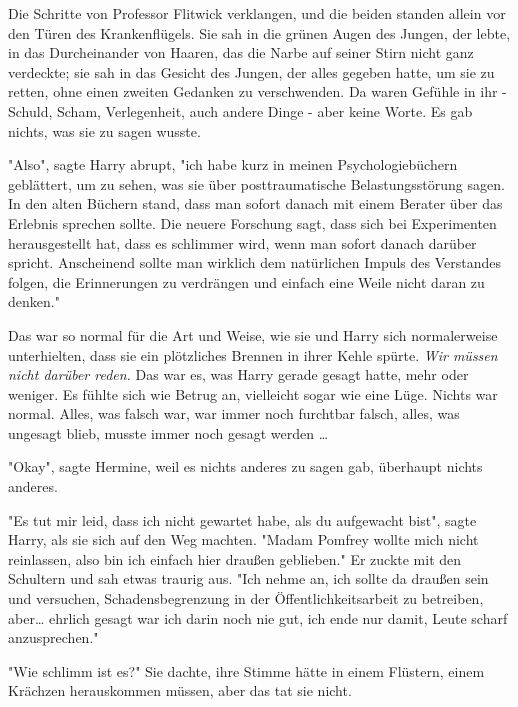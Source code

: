 {Die Schritte von Professor Flitwick verklangen, und die beiden standen allein vor den Türen des Krankenflügels. Sie sah in die grünen Augen des Jungen, der lebte, in das Durcheinander von Haaren, das die Narbe auf seiner Stirn nicht ganz verdeckte; sie sah in das Gesicht des Jungen, der alles gegeben hatte, um sie zu retten, ohne einen zweiten Gedanken zu verschwenden. Da waren Gefühle in ihr - Schuld, Scham, Verlegenheit, auch andere Dinge - aber keine Worte. Es gab nichts, was sie zu sagen wusste.

"Also", sagte Harry abrupt, "ich habe kurz in meinen Psychologiebüchern geblättert, um zu sehen, was sie über posttraumatische Belastungsstörung sagen. In den alten Büchern stand, dass man sofort danach mit einem Berater über das Erlebnis sprechen sollte. Die neuere Forschung sagt, dass sich bei Experimenten herausgestellt hat, dass es schlimmer wird, wenn man sofort danach darüber spricht. Anscheinend sollte man wirklich dem natürlichen Impuls des Verstandes folgen, die Erinnerungen zu verdrängen und einfach eine Weile nicht daran zu denken."

Das war so normal für die Art und Weise, wie sie und Harry sich normalerweise unterhielten, dass sie ein plötzliches Brennen in ihrer Kehle spürte. \emph{Wir müssen nicht darüber reden.} Das war es, was Harry gerade gesagt hatte, mehr oder weniger. Es fühlte sich wie Betrug an, vielleicht sogar wie eine Lüge. Nichts war normal. Alles, was falsch war, war immer noch furchtbar falsch, alles, was ungesagt blieb, musste immer noch gesagt werden …

"Okay", sagte Hermine, weil es nichts anderes zu sagen gab, überhaupt nichts anderes.

"Es tut mir leid, dass ich nicht gewartet habe, als du aufgewacht bist", sagte Harry, als sie sich auf den Weg machten. "Madam Pomfrey wollte mich nicht reinlassen, also bin ich einfach hier draußen geblieben." Er zuckte mit den Schultern und sah etwas traurig aus. "Ich nehme an, ich sollte da draußen sein und versuchen, Schadensbegrenzung in der Öffentlichkeitsarbeit zu betreiben, aber… ehrlich gesagt war ich darin noch nie gut, ich ende nur damit, Leute scharf anzusprechen."

"Wie schlimm ist es?" Sie dachte, ihre Stimme hätte in einem Flüstern, einem Krächzen herauskommen müssen, aber das tat sie nicht.

}
